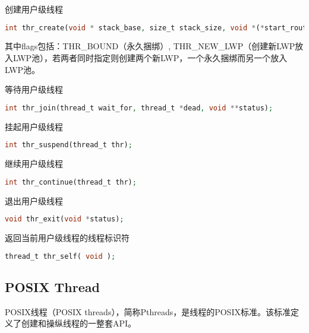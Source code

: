 \begin{compactitem}
\item 创建用户级线程

\begin{lstlisting}[language=PHP]
int thr_create(void * stack_base, size_t stack_size, void *(*start_routine，void *), void * arg, long flags, thread_t * new_thr);
\end{lstlisting}

其中flags包括：THR_BOUND（永久捆绑）, THR_NEW_LWP（创建新LWP放入LWP池），若两者同时指定则创建两个新LWP，一个永久捆绑而另一个放入LWP池。

\item 等待用户级线程

\begin{lstlisting}[language=PHP]
int thr_join(thread_t wait_for, thread_t *dead, void **status);
\end{lstlisting}

\item 挂起用户级线程

\begin{lstlisting}[language=PHP]
int thr_suspend(thread_t thr);
\end{lstlisting}

\item 继续用户级线程

\begin{lstlisting}[language=PHP]
int thr_continue(thread_t thr);
\end{lstlisting}

\item 退出用户级线程

\begin{lstlisting}[language=PHP]
void thr_exit(void *status);
\end{lstlisting}

\item 返回当前用户级线程的线程标识符

\begin{lstlisting}[language=PHP]
thread_t thr_self( void );
\end{lstlisting}

\end{compactitem}

\subsection{POSIX Thread}

POSIX线程（POSIX threads），简称Pthreads，是线程的POSIX标准。该标准定义了创建和操纵线程的一整套API。


